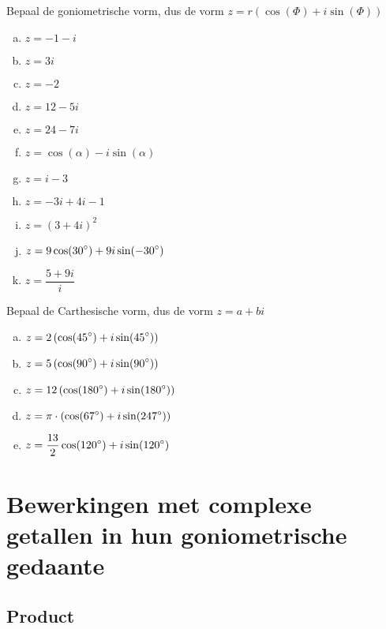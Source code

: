 \documentclass[12pt,twoside,a4]{article}
\begin{document}
\begin{oefening}
Bepaal de goniometrische vorm, dus de vorm $z=r(\cos(\Phi)+i\sin(\Phi))$
\begin{multicols}{2}
\begin{enumerate}[(a)]
  \itemsep.5em
  \item $\displaystyle z=-1-i$
  \item $\displaystyle z=3i$
  \item $\displaystyle z=-2$
  \item $\displaystyle z=12-5i$
  \item $\displaystyle z=24-7i$
  \item $\displaystyle z=\cos(\alpha)-i\sin(\alpha)$
  \item $\displaystyle z=i-3$
  \item $\displaystyle z=-3i+4i-1$
  \item $\displaystyle z=\left(3+4i\right)^2$
  \item $\displaystyle z=9\cos(30^\circ)+9i\sin(-30^\circ)$
  \item $\displaystyle z=\dfrac{5+9i}{i}$
\end{enumerate}
\end{multicols}
\end{oefening}

\begin{oefening}
Bepaal de Carthesische vorm, dus de vorm $z=a+bi$
\begin{enumerate}[(a)]
  \itemsep.5em
  \item $\displaystyle z=2\left(\cos(45^\circ)+i\sin(45^\circ)\right)$
  \item $\displaystyle z=5\left(\cos(90^\circ)+i\sin(90^\circ)\right)$
  \item $\displaystyle z=12\left(\cos(180^\circ)+i\sin(180^\circ)\right)$
  \item $\displaystyle z=\pi\cdot\left(\cos(67^\circ)+i\sin(247^\circ)\right)$
  \item $\displaystyle z=\dfrac{13}{2}\cos(120^\circ)+i\sin(120^\circ)$
\end{enumerate}
\end{oefening}

\pagebreak
\section{Bewerkingen met complexe getallen in hun goniometrische gedaante}

\subsection{Product}
\end{document}

